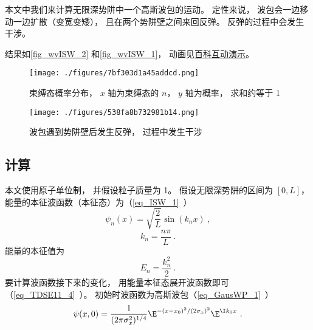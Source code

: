 

本文中我们来计算无限深势阱中一个高斯波包的运动。 定性来说， 波包会一边移动一边扩散（变宽变矮）， 且在两个势阱壁之间来回反弹。 反弹的过程中会发生干涉。

结果如\autoref{fig_wvISW_2} 和\autoref{fig_wvISW_1}， 动画见\href{https://wuli.wiki/apps/wvISW.html}{百科互动演示}。

\begin{figure}[ht]
\centering
\texttt{[image: ./figures/7bf303d1a45addcd.png]}
\caption{束缚态概率分布， $x$ 轴为束缚态的 $n$， $y$ 轴为概率， 求和约等于 1} \label{fig_wvISW_2}
\end{figure}

\begin{figure}[ht]
\centering
\texttt{[image: ./figures/538fa8b732981b14.png]}
\caption{波包遇到势阱壁后发生反弹， 过程中发生干涉} \label{fig_wvISW_1}
\end{figure}

\subsection{计算}

本文使用原子单位制， 并假设粒子质量为 1。 假设无限深势阱的区间为 $[0, L]$， 能量的本征波函数（本征态）为（\autoref{eq_ISW_1}~）
\begin{equation}
\psi _n(x) = \sqrt{\frac{2}{L}} \sin(k_n x)~,
\end{equation}
\begin{equation}
k_n = \frac{n\pi }{L}~.
\end{equation}
能量的本征值为
\begin{equation}
E_n = \frac{k_n^2}{2}~.
\end{equation}
要计算波函数接下来的变化， 用能量本征态展开波函数即可（\autoref{eq_TDSE11_4}~）。 初始时波函数为高斯波包（\autoref{eq_GausWP_1}~）
\begin{equation}
\psi (x,0) = \frac{1}{(2\pi \sigma _x ^2)^{1/4}} \E^{-(x - x_0)^2/(2\sigma _x)^2} \E^{\I k_0x}~.
\end{equation}

